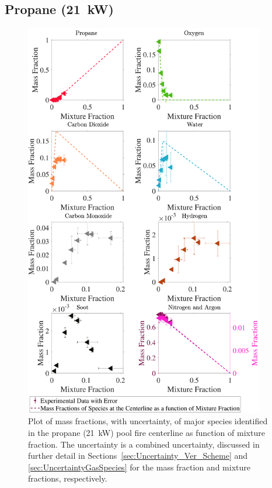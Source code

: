 \documentclass[12pt]{article}
\begin{document}
\subsection{Propane (21~kW)}
\label{ssec:Propane20KW_ALL_Mix_Frac}
\begin{figure}[!h]
	\centering
\includegraphics[width=10.5cm,keepaspectratio]{Propane 21KW_Mixture_Fraction_Major_Plot.pdf}
	\caption[Species mass fractions superimposed on propane (21~kW) state relations]{Plot of mass fractions, with uncertainty, of major species identified in the propane (21~kW) pool fire centerline as function of mixture fraction. The uncertainty is a combined uncertainty, discussed in further detail in Sections~\ref{sec:Uncertainty_Ver_Scheme} and \ref{sec:UncertaintyGasSpecies} for the mass fraction and mixture fractions, respectively.}
	\label{fig:Propane20KW_MIX_Frac_Major}
\end{figure}

\pagebreak
\end{document}
